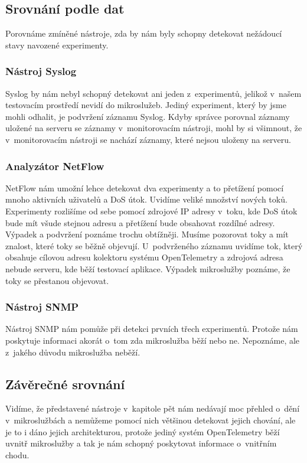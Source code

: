 \subsection{Srovnání podle dat}
Porovnáme zmíněné nástroje, zda by nám byly schopny detekovat nežádoucí stavy navozené experimenty.

\subsubsection{Nástroj Syslog}
Syslog by nám nebyl schopný detekovat ani jeden z~experimentů, jelikož v~našem testovacím prostředí nevidí do mikroslužeb. Jediný experiment, který by jsme mohli odhalit, je podvržení záznamu Syslog. Kdyby správce porovnal záznamy uložené na serveru se záznamy v~monitorovacím nástroji, mohl by si všimnout, že v~monitorovacím nástroji se nachází záznamy, které nejsou uloženy na serveru.

\subsubsection{Analyzátor NetFlow}
NetFlow nám umožní lehce detekovat dva experimenty a to přetížení pomocí mnoho aktivních uživatelů a DoS útok. Uvidíme veliké množství nových toků. Experimenty rozlišíme od sebe pomocí zdrojové IP adresy v~toku, kde DoS útok bude mít všude stejnou adresu a přetížení bude obsahovat rozdílné adresy. Výpadek a podvržení poznáme trochu obtížněji. Musíme pozorovat toky a mít znalost, které toky se běžně objevují. U~podvrženého záznamu uvidíme tok, který obsahuje cílovou adresu kolektoru systému OpenTelemetry a zdrojová adresa nebude serveru, kde běží testovací aplikace. Výpadek mikroslužby poznáme, že toky se přestanou objevovat.

\subsubsection{Nástroj SNMP}
Nástroj SNMP nám pomůže při detekci prvních třech experimentů. Protože nám poskytuje informaci akorát o~tom zda mikroslužba běží nebo ne. Nepoznáme, ale z~jakého důvodu mikroslužba neběží.


\subsection{Závěrečné srovnání}

Vidíme, že představené nástroje v~kapitole pět nám nedávají moc přehled o~dění v~mikroslužbách a nemůžeme pomocí nich většinou detekovat jejich chování, ale je to i dáno jejich architekturou, protože jediný systém OpenTelemetry běží uvnitř mikroslužby a tak je nám schopný poskytovat informace o~vnitřním chodu.


